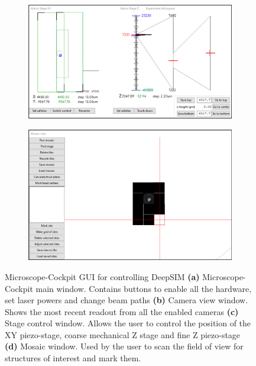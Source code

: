 \begin{figure}[h]
	\begin{subfigure}[t]{0.51\textwidth}
		\centering
		\includegraphics[width=\linewidth]{images/cockpit_GUI_stage.png}
		\caption{}
		\label{fig:DeepSIM_control_software_stage_control}
	\end{subfigure}
	\begin{subfigure}[t]{0.445\textwidth}
		\centering
		\includegraphics[width=\linewidth]{images/cockpit_GUI_mosaic.png}
		\caption{}
		\label{fig:DeepSIM_control_software_mosaic}
	\end{subfigure}
	\caption[Microscope-Cockpit GUI for controlling DeepSIM]{Microscope-Cockpit GUI for controlling DeepSIM \textbf{(a)} Microscope-Cockpit main window. Contains buttons to enable all the hardware, set laser powers and change beam paths \textbf{(b)} Camera view window. Shows the most recent readout from all the enabled cameras \textbf{(c)} Stage control window. Allows the user to control the position of the XY piezo-stage, coarse mechanical Z stage and fine Z piezo-stage \textbf{(d)} Mosaic window. Used by the user to scan the field of view for structures of interest and mark them.}
	\label{fig:Cockpit_UI}
\end{figure}

